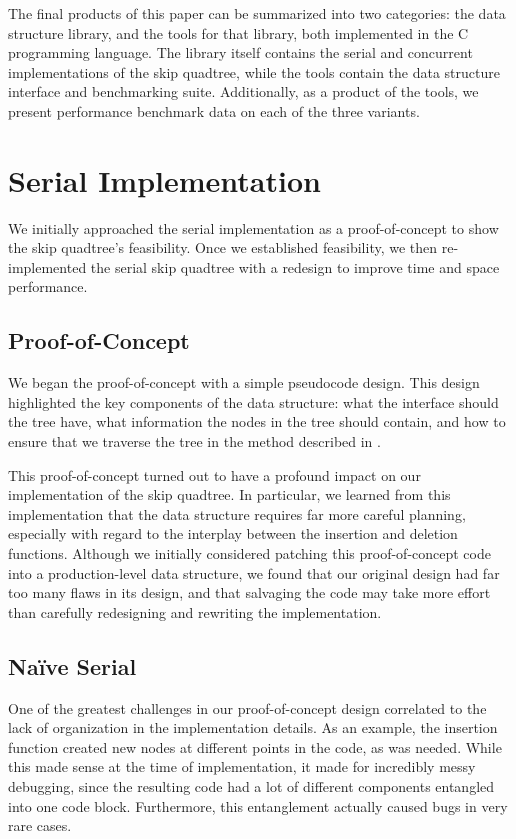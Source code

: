 \documentclass[10pt]{article}
\begin{document}
The final products of this paper can be summarized into two categories: the data structure library, and the tools for that library, both implemented in the C programming language. The library itself contains the serial and concurrent implementations of the skip quadtree, while the tools contain the data structure interface and benchmarking suite. Additionally, as a product of the tools, we present performance benchmark data on each of the three variants.

\section{Serial Implementation}
We initially approached the serial implementation as a proof-of-concept to show the skip quadtree's feasibility. Once we established feasibility, we then re-implemented the serial skip quadtree with a redesign to improve time and space performance.

\subsection{Proof-of-Concept}
We began the proof-of-concept with a simple pseudocode design. This design highlighted the key components of the data structure: what the interface should the tree have, what information the nodes in the tree should contain, and how to ensure that we traverse the tree in the method described in \cite{sqt}.

This proof-of-concept turned out to have a profound impact on our implementation of the skip quadtree. In particular, we learned from this implementation that the data structure requires far more careful planning, especially with regard to the interplay between the insertion and deletion functions. Although we initially considered patching this proof-of-concept code into a production-level data structure, we found that our original design had far too many flaws in its design, and that salvaging the code may take more effort than carefully redesigning and rewriting the implementation.

\subsection{Na\"ive Serial}
One of the greatest challenges in our proof-of-concept design correlated to the lack of organization in the implementation details. As an example, the insertion function created new nodes at different points in the code, as was needed. While this made sense at the time of implementation, it made for incredibly messy debugging, since the resulting code had a lot of different components entangled into one code block. Furthermore, this entanglement actually caused bugs in very rare cases.
\end{document}

